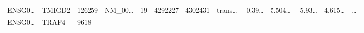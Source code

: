 \documentclass[
]{article}
\begin{document}
\begin{longtable}[]{@{}lllllllllllll@{}}
\begin{minipage}[t]{0.05\columnwidth}
ENSG0\ldots{}\strut
\end{minipage} & \begin{minipage}[t]{0.05\columnwidth}\raggedright
TMIGD2\strut
\end{minipage} & \begin{minipage}[t]{0.05\columnwidth}\raggedright
126259\strut
\end{minipage} & \begin{minipage}[t]{0.05\columnwidth}\raggedright
NM\_00\ldots{}\strut
\end{minipage} & \begin{minipage}[t]{0.05\columnwidth}\raggedright
19\strut
\end{minipage} & \begin{minipage}[t]{0.05\columnwidth}\raggedright
4292227\strut
\end{minipage} & \begin{minipage}[t]{0.05\columnwidth}\raggedright
4302431\strut
\end{minipage} & \begin{minipage}[t]{0.05\columnwidth}\raggedright
trans\ldots{}\strut
\end{minipage} & \begin{minipage}[t]{0.05\columnwidth}\raggedright
-0.39\ldots{}\strut
\end{minipage} & \begin{minipage}[t]{0.05\columnwidth}\raggedright
5.504\ldots{}\strut
\end{minipage} & \begin{minipage}[t]{0.05\columnwidth}\raggedright
-5.93\ldots{}\strut
\end{minipage} & \begin{minipage}[t]{0.05\columnwidth}\raggedright
4.615\ldots{}\strut
\end{minipage} & \begin{minipage}[t]{0.02\columnwidth}\raggedright
\ldots{}\strut
\end{minipage}\tabularnewline
\begin{minipage}[t]{0.05\columnwidth}\raggedright
ENSG0\ldots{}\strut
\end{minipage} & \begin{minipage}[t]{0.05\columnwidth}\raggedright
TRAF4\strut
\end{minipage} & \begin{minipage}[t]{0.05\columnwidth}\raggedright
9618\strut
\end{minipage} & \begin{minipage}[t]{0.05\columnwidth}\raggedright

\end{minipage}
\end{longtable}
\end{document}
